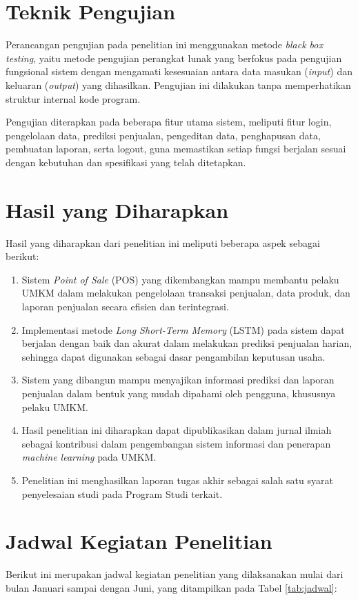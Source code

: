 \section{Teknik Pengujian}
Perancangan pengujian pada penelitian ini menggunakan metode \textit{black box testing}, yaitu metode pengujian perangkat lunak yang berfokus pada pengujian fungsional sistem dengan mengamati kesesuaian antara data masukan (\textit{input}) dan keluaran (\textit{output}) yang dihasilkan. Pengujian ini dilakukan tanpa memperhatikan struktur internal kode program.

Pengujian diterapkan pada beberapa fitur utama sistem, meliputi fitur login, pengelolaan data, prediksi penjualan, pengeditan data, penghapusan data, pembuatan laporan, serta logout, guna memastikan setiap fungsi berjalan sesuai dengan kebutuhan dan spesifikasi yang telah ditetapkan.

\section{Hasil yang Diharapkan}
Hasil yang diharapkan dari penelitian ini meliputi beberapa aspek sebagai berikut:
\begin{enumerate}
    \item Sistem \textit{Point of Sale} (POS) yang dikembangkan mampu membantu pelaku UMKM dalam melakukan pengelolaan transaksi penjualan, data produk, dan laporan penjualan secara efisien dan terintegrasi.
    \item Implementasi metode \textit{Long Short-Term Memory} (LSTM) pada sistem dapat berjalan dengan baik dan akurat dalam melakukan prediksi penjualan harian, sehingga dapat digunakan sebagai dasar pengambilan keputusan usaha.
    \item Sistem yang dibangun mampu menyajikan informasi prediksi dan laporan penjualan dalam bentuk yang mudah dipahami oleh pengguna, khususnya pelaku UMKM.
    \item Hasil penelitian ini diharapkan dapat dipublikasikan dalam jurnal ilmiah sebagai kontribusi dalam pengembangan sistem informasi dan penerapan \textit{machine learning} pada UMKM.
    \item Penelitian ini menghasilkan laporan tugas akhir sebagai salah satu syarat penyelesaian studi pada Program Studi terkait.
\end{enumerate}

\section{Jadwal Kegiatan Penelitian}
Berikut ini merupakan jadwal kegiatan penelitian yang dilaksanakan mulai dari bulan Januari sampai dengan Juni, yang ditampilkan pada Tabel \ref{tab:jadwal}:


